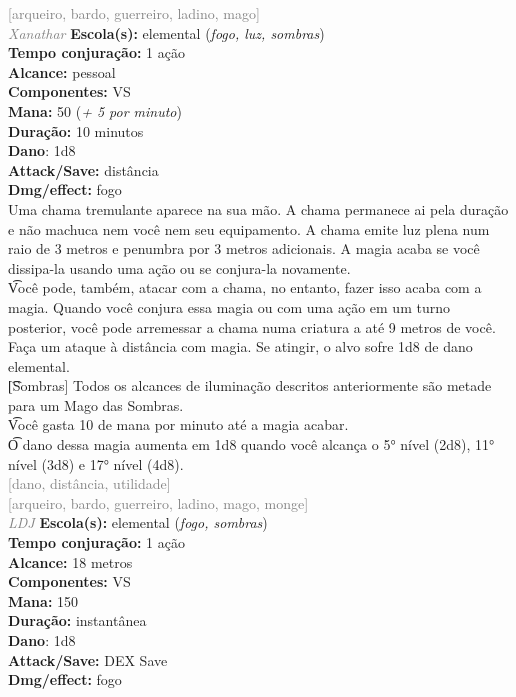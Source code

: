 \documentclass{RPG_Adventure}[2021/10/20]
\begin{document}
{\scriptsize \textcolor{gray}{[arqueiro, bardo, guerreiro, ladino, mago]\\}}
{\tiny \textcolor{gray}{\textit{Xanathar}}}\jump{}
{\small \t \textbf{Escola(s):} elemental (\textit{fogo, luz, sombras})\\\t \textbf{Tempo conjuração:} 1 ação\\\t \textbf{Alcance:} pessoal\\\t \textbf{Componentes:} VS\\\t \textbf{Mana:} 50 (\textit{+ 5 por minuto})\\\t \textbf{Duração:} 10 minutos\\\t \textbf{Dano}: 1d8\\\t \textbf{Attack/Save:} distância\\\t \textbf{Dmg/effect:} fogo\\}
{\normalsize Uma chama tremulante aparece na sua mão. A chama permanece ai pela duração e não machuca nem você nem seu equipamento. A chama emite luz plena num raio de 3 metros e penumbra por 3 metros adicionais. A magia acaba se você dissipa-la usando uma ação ou se conjura-la novamente.\\\t Você pode, também, atacar com a chama, no entanto, fazer isso acaba com a magia. Quando você conjura essa magia ou com uma ação em um turno posterior, você pode arremessar a chama numa criatura a até 9 metros de você. Faça um ataque à distância com magia. Se atingir, o alvo sofre 1d8 de dano elemental.\\\t [Sombras] Todos os alcances de iluminação descritos anteriormente são metade para um Mago das Sombras.\\\t Você gasta 10 de mana por minuto até a magia acabar.\\\t O dano dessa magia aumenta em 1d8 quando você alcança o 5° nível (2d8), 11° nível (3d8) e 17° nível (4d8).\\}
{\scriptsize \textcolor{gray}{[dano, distância, utilidade]\\}}
{\scriptsize \textcolor{gray}{[arqueiro, bardo, guerreiro, ladino, mago, monge]\\}}
{\tiny \textcolor{gray}{\textit{LDJ}}}\jump{}
{\small \t \textbf{Escola(s):} elemental (\textit{fogo, sombras})\\\t \textbf{Tempo conjuração:} 1 ação\\\t \textbf{Alcance:} 18 metros\\\t \textbf{Componentes:} VS\\\t \textbf{Mana:} 150\\\t \textbf{Duração:} instantânea\\\t \textbf{Dano}: 1d8\\\t \textbf{Attack/Save:} DEX Save\\\t \textbf{Dmg/effect:} fogo\\}
\end{document}
